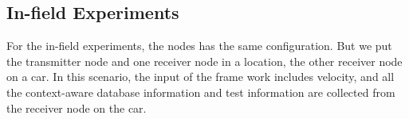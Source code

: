 


\subsection{In-field Experiments}

For the in-field experiments, the nodes has the same configuration. But we put the transmitter node and one receiver node in a location, the other receiver node on a car. In this scenario, the input of the frame work includes velocity, and all the context-aware database information and test information are collected from the receiver node on the car.




